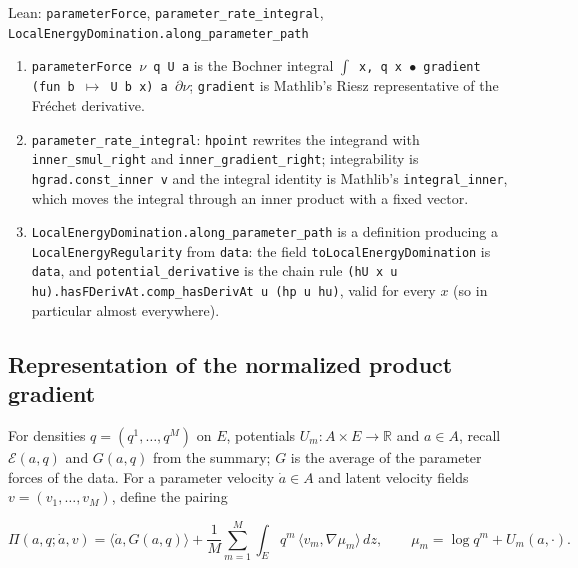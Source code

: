 \documentclass[11pt,a4paper]{report}
\begin{document}
\begin{leanbox}{Lean: \texttt{parameterForce}, \texttt{parameter\_\allowbreak{}rate\_\allowbreak{}integral}, \texttt{LocalEnergyDomination.\allowbreak{}along\_\allowbreak{}parameter\_\allowbreak{}path}}
\begin{enumerate}
\item \texttt{parameter\allowbreak{}Force \ensuremath{\nu} q U a} is the Bochner integral \texttt{\ensuremath{\int} x, q x \ensuremath{\bullet} gradient (fun b \ensuremath{\mapsto} U b x) a \ensuremath{\partial}\ensuremath{\nu}}; \texttt{gradient} is Mathlib's Riesz representative of the Fréchet derivative.

\item \texttt{parameter\_\allowbreak{}rate\_\allowbreak{}integral}: \texttt{hpoint} rewrites the integrand with \texttt{inner\_\allowbreak{}smul\_\allowbreak{}right} and \texttt{inner\_\allowbreak{}gradient\_\allowbreak{}right}; integrability is \texttt{hgrad.\allowbreak{}const\_\allowbreak{}inner v} and the integral identity is Mathlib's \texttt{integral\_\allowbreak{}inner}, which moves the integral through an inner product with a fixed vector.

\item \texttt{Local\allowbreak{}Energy\allowbreak{}Domination.\allowbreak{}along\_\allowbreak{}parameter\_\allowbreak{}path} is a definition producing a \texttt{Local\allowbreak{}Energy\allowbreak{}Regularity} from \texttt{data}: the field \texttt{to\allowbreak{}Local\allowbreak{}Energy\allowbreak{}Domination} is \texttt{data}, and \texttt{potential\_\allowbreak{}derivative} is the chain rule \texttt{(h\allowbreak{}U x u hu).\allowbreak{}has\allowbreak{}FDeriv\allowbreak{}At.\allowbreak{}comp\_\allowbreak{}has\allowbreak{}Deriv\allowbreak{}At u (hp u hu)}, valid for every \(x\) (so in particular almost everywhere).

\end{enumerate}
\end{leanbox}
\subsection{\texorpdfstring{Representation of the normalized product gradient}{Representation of the normalized product gradient}}


For densities \(q=(q^1,\dots,q^M)\) on \(E\), potentials \(U_m:A\times E\to\mathbb R\) and \(a\in A\), recall \(\mathcal E(a,q)\) and \(G(a,q)\) from the summary; \(G\) is the average of the parameter forces of the data. For a parameter velocity \(\dot a\in A\) and latent velocity fields \(v=(v_1,\dots,v_M)\), define the pairing


\[\Pi(a,q;\dot a,v)=\langle\dot a,G(a,q)\rangle+\frac1M\sum_{m=1}^M\int_Eq^m\,\langle v_m,\nabla\mu_m\rangle\,dz,\qquad\mu_m=\log q^m+U_m(a,\cdot).\]
\end{document}
